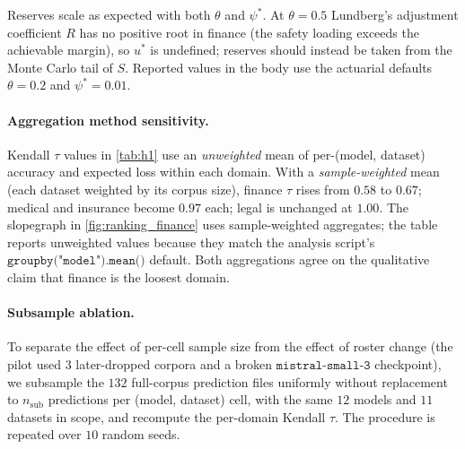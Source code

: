 \documentclass[11pt]{article}
\begin{document}
\begin{center}
\end{center}

\noindent Reserves scale as expected with both $\theta$ and
$\psi^\ast$. At $\theta = 0.5$ Lundberg's adjustment coefficient
$R$ has no positive root in finance (the safety loading exceeds
the achievable margin), so $u^\ast$ is undefined; reserves
should instead be taken from the Monte Carlo tail of $S$.
Reported values in the body use the actuarial defaults
$\theta = 0.2$ and $\psi^\ast = 0.01$.

\paragraph{Aggregation method sensitivity.}
Kendall $\tau$ values in \autoref{tab:h1} use an
\emph{unweighted} mean of per-(model, dataset) accuracy and
expected loss within each domain. With a \emph{sample-weighted}
mean (each dataset weighted by its corpus size), finance
$\tau$ rises from $0.58$ to $0.67$; medical and insurance
become $0.97$ each; legal is unchanged at $1.00$. The
slopegraph in \autoref{fig:ranking_finance} uses
sample-weighted aggregates; the table reports unweighted values
because they match the analysis script's
$\texttt{groupby("model").mean()}$ default. Both aggregations
agree on the qualitative claim that finance is the loosest
domain.

\paragraph{Subsample ablation.}
\label{sec:app-subsample-ablation}
To separate the effect of per-cell sample size from the effect of
roster change (the pilot used $3$ later-dropped corpora and a
broken $\texttt{mistral-small-3}$ checkpoint), we subsample the
$132$ full-corpus prediction files uniformly without replacement
to $n_{\text{sub}}$ predictions per (model, dataset) cell, with
the same $12$ models and $11$ datasets in scope, and recompute
the per-domain Kendall $\tau$. The procedure is repeated over
$10$ random seeds.
\end{document}
